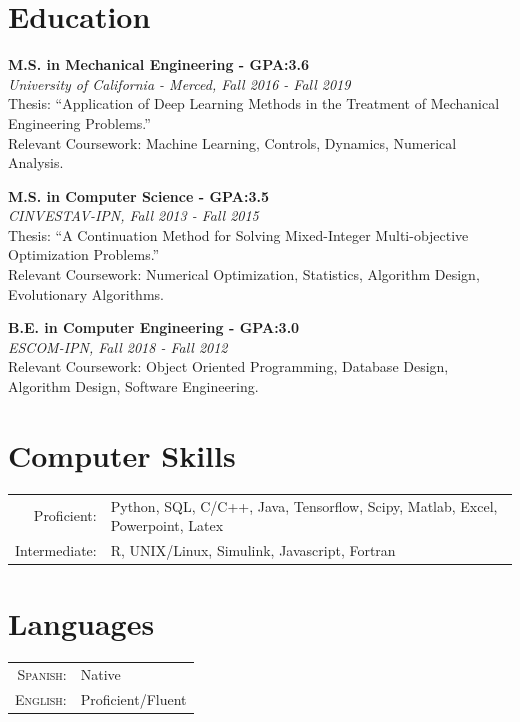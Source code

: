 \documentclass[a4paper,10pt]{article}
\begin{document}
\begin{minipage}[H]{0.7\textwidth}
\section{Education}

\textbf{M.S. in Mechanical Engineering - GPA:3.6}\\
\emph{University of California - Merced, Fall 2016 - Fall 2019}\\
Thesis: ``Application of Deep Learning Methods in the Treatment of Mechanical Engineering Problems.''\\
Relevant Coursework: Machine Learning, Controls, Dynamics, Numerical Analysis.

\textbf{M.S. in Computer Science - GPA:3.5}\\
\emph{CINVESTAV-IPN, Fall 2013 - Fall 2015}\\
Thesis: ``A Continuation Method for Solving Mixed-Integer Multi-objective Optimization Problems.''\\
Relevant Coursework: Numerical Optimization, Statistics, Algorithm Design, Evolutionary Algorithms.

\textbf{B.E. in Computer Engineering - GPA:3.0}\\
\emph{ESCOM-IPN, Fall 2018 - Fall 2012}\\
Relevant Coursework: Object Oriented Programming, Database Design, Algorithm Design, Software Engineering.
\end{minipage}%
\begin{minipage}[H]{0.2\textwidth}%

\section{Computer Skills}
\begin{tabular}{rl}
Proficient:& Python, \textsc{SQL}, \textsc{C/C++}, Java, Tensorflow, Scipy, Matlab, Excel, Powerpoint, Latex\\
Intermediate:& R, \textsc{UNIX}/Linux, Simulink, Javascript, Fortran\\
\end{tabular}

\section{Languages}
\begin{tabular}{rl}
\textsc{Spanish:}&Native\\
\textsc{English:}&Proficient/Fluent\\
\end{tabular}

\end{minipage}%
\end{document}
